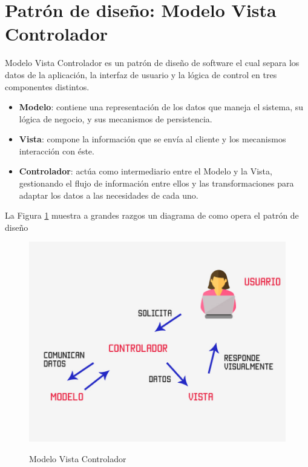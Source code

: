 \section{Patrón de diseño: Modelo Vista Controlador}
Modelo Vista Controlador es un patrón de diseño de software el cual separa los datos de la aplicación, la interfaz de usuario y la lógica de control en tres componentes distintos.\\

\begin{itemize}
	\item \textbf{Modelo}: contiene una representación de los datos que maneja el sistema, su lógica de negocio, y sus mecanismos de persistencia.
	
	\item \textbf{Vista}: compone la información que se envía al cliente y los mecanismos interacción con éste.
	
	\item \textbf{Controlador}: actúa como intermediario entre el Modelo y la Vista, gestionando el flujo de información entre ellos y las transformaciones para adaptar los datos a las necesidades de cada uno.
\end{itemize}

La Figura \ref{fig:mvc} muestra a grandes razgos un diagrama de como opera el patrón de diseño

\begin{figure}[htbp]
	\begin{center}
		\hypertarget{fig:mvc}{
			\includegraphics[scale=.3]{propuestaSolicion/turismo/images/mvc}
			\caption{Modelo Vista Controlador}\cite{MVC}
		}
		\label{fig:mvc}
	\end{center}
\end{figure}

